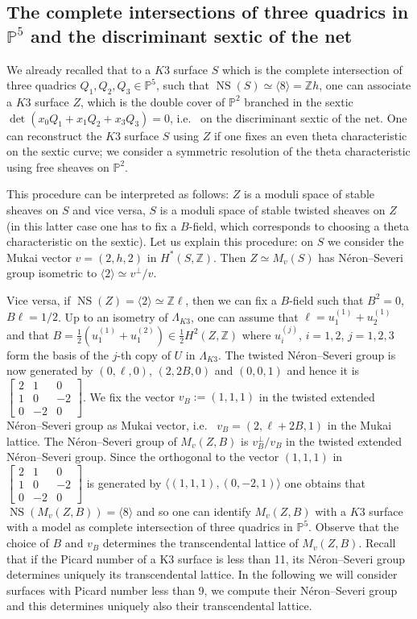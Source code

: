 \documentclass{amsart}
\theoremstyle{definition}
\numberwithin{equation}{section}
\numberwithin{equation}{section} \theoremstyle{definition}
\DeclareMathOperator{\NS}{NS}
\newcommand\PP{{\mathbb{P}}}
\newcommand\Z{\mathbb{Z}}
\begin{document}
\subsection{The complete intersections of three quadrics in $\mathbb{P}^5$ and the discriminant sextic of the net}\label{subsubsec: net and discriminant sextic}
We already recalled that to a $K3$ surface $S$ which is the complete intersection of three quadrics $Q_1,Q_2,Q_3\in\mathbb{P}^5$, such that  $\NS(S)\simeq \langle 8\rangle=\Z h$, one can associate a $K3$ surface $Z$, which is the double cover of $\mathbb{P}^2$ branched in the sextic $\det(x_0Q_1+x_1Q_2+x_3Q_3)=0$, i.e.~ on the discriminant sextic of the net. One can reconstruct the $K3$ surface $S$ using $Z$ if one fixes an even theta characteristic on the sextic curve; we consider a symmetric resolution of the theta characteristic using free sheaves on $\PP^2$.

This procedure can be interpreted as follows: $Z$ is a moduli space of stable sheaves on $S$ and vice versa, $S$ is a moduli space of stable twisted  sheaves on $Z$ (in this latter case one has to fix a $B$-field, which corresponds to choosing a theta characteristic on the sextic).
Let us explain this procedure: on $S$ we consider the Mukai vector $v=(2,h,2)$ in $H^*(S,\Z)$. Then $Z\simeq M_v(S)$ has N\'eron--Severi group isometric to $\langle 2\rangle\simeq v^{\perp}/v$.

Vice versa, if $\NS(Z)=\langle 2\rangle\simeq \Z\ell$, then we can fix a $B$-field such that $B^2=0$, $B\ell=1/2$. Up to an isometry of $\Lambda_{K3}$, one can assume that $\ell=u_1^{(1)}+u_2^{(1)}$ and that $B=\frac{1}{2}(u_1^{(1)}+u_1^{(2)})\in \frac{1}{2}H^2(Z,\Z)$ where $u_i^{(j)}$, $i=1,2$, $j=1,2,3$ form the basis of the $j$-th copy of $U$ in $\Lambda_{K3}$. The twisted N\'eron--Severi group is now generated by  $(0,\ell,0)$, $(2,2B,0)$ and $(0,0,1)$ and hence it is $\left[\begin{array}{ccc}2&1&0\\1&0&-2\\0&-2&0\end{array}\right]$. We fix the vector $v_B:=(1,1,1)$ in the twisted extended N\'eron--Severi group as Mukai vector, i.e.~ $v_B=(2,\ell+2B,1)$ in the Mukai lattice. The N\'eron--Severi group of $M_v(Z,B)$ is $v_B^{\perp}/v_B$ in the twisted extended N\'eron--Severi group. 
Since the orthogonal to the vector $(1,1,1)$ in $\left[\begin{array}{ccc}2&1&0\\1&0&-2\\0&-2&0\end{array}\right]$ is generated by $\langle (1,1,1), (0,-2,1)\rangle$ one obtains that $\NS(M_v(Z,B))=\langle 8\rangle$ and so one can identify $M_v(Z,B)$ with a $K3$ surface with a model as complete intersection of three quadrics in $\mathbb{P}^5$. Observe that the choice of $B$ and $v_B$ determines the transcendental lattice of $M_v(Z,B)$. Recall that if the Picard number of a K3 surface is less than 11, its N\'eron--Severi group determines uniquely its transcendental lattice. In the following we will consider surfaces with Picard number less than 9, we compute their N\'eron--Severi group and this determines uniquely also their transcendental lattice.
\end{document}
